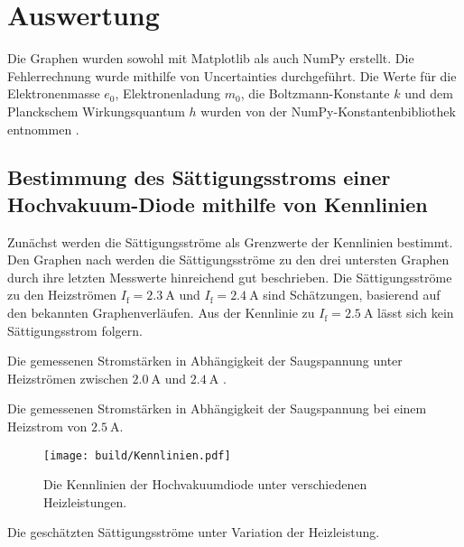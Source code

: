 \section{Auswertung}
\label{sec:Auswertung}

Die Graphen wurden sowohl mit Matplotlib \cite{matplotlib} als auch NumPy \cite{numpy} erstellt. Die
 Fehlerrechnung wurde mithilfe von Uncertainties \cite{uncertainties} durchgeführt. Die Werte für die Elektronenmasse $e_0$, Elektronenladung $m_0$, die Boltzmann-Konstante $k$ und dem Planckschem Wirkungsquantum $h$ wurden von der NumPy-Konstantenbibliothek entnommen \cite{nistgov}.


 \subsection{Bestimmung des Sättigungsstroms einer Hochvakuum-Diode mithilfe von Kennlinien}
Zunächst werden die Sättigungsströme als Grenzwerte der Kennlinien bestimmt. Den Graphen nach werden die
Sättigungsströme zu den drei untersten Graphen durch ihre letzten Messwerte hinreichend
gut beschrieben. Die Sättigungsströme zu den Heizströmen $I_\text{f} = \SI{2.3}{\ampere}$ und $I_\text{f} = \SI{2.4}{\ampere}$
sind Schätzungen, basierend auf den bekannten Graphenverläufen. Aus der Kennlinie
zu $I_\text{f} = \SI{2.5}{\ampere}$ lässt sich kein Sättigungsstrom folgern.

 \begin{table}
 	\centering
 	\caption{Die gemessenen Stromstärken in Abhängigkeit der Saugspannung unter Heizströmen zwischen $\SI{2,0}{\ampere}$ und $\SI{2,4}{\ampere}$ .}
 	
 \end{table}

 \begin{table}
  \centering
  \caption{Die gemessenen Stromstärken in Abhängigkeit der Saugspannung bei einem Heizstrom von $\SI{2,5}{\ampere}$.}
  
  
 \end{table}

 \begin{figure}
 	\centering
 	\caption{Die Kennlinien der Hochvakuumdiode unter verschiedenen Heizleistungen.}
 	\texttt{[image: build/Kennlinien.pdf]}
 	\label{fig:Graph}
 \end{figure}

 \begin{table}
  \centering
  \caption{Die geschätzten Sättigungsströme unter Variation der Heizleistung.}
  
 \end{table}




